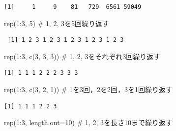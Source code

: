 \documentclass[
  letterpaper,
  DIV=11,
  numbers=noendperiod]{scrreprt}
\newenvironment{Shaded}{\begin{snugshade}}{\end{snugshade}}
\newcommand{\AttributeTok}[1]{\textcolor[rgb]{0.40,0.45,0.13}{#1}}
\newcommand{\CommentTok}[1]{\textcolor[rgb]{0.37,0.37,0.37}{#1}}
\newcommand{\DecValTok}[1]{\textcolor[rgb]{0.68,0.00,0.00}{#1}}
\newcommand{\FunctionTok}[1]{\textcolor[rgb]{0.28,0.35,0.67}{#1}}
\newcommand{\NormalTok}[1]{\textcolor[rgb]{0.00,0.23,0.31}{#1}}
\newcommand{\SpecialCharTok}[1]{\textcolor[rgb]{0.37,0.37,0.37}{#1}}
\begin{document}
\begin{verbatim}
[1]     1     9    81   729  6561 59049
\end{verbatim}

\begin{Shaded}
\begin{Highlighting}[]
\FunctionTok{rep}\NormalTok{(}\DecValTok{1}\SpecialCharTok{:}\DecValTok{3}\NormalTok{, }\DecValTok{5}\NormalTok{) }\CommentTok{\# 1, 2, 3を5回繰り返す}
\end{Highlighting}
\end{Shaded}

\begin{verbatim}
 [1] 1 2 3 1 2 3 1 2 3 1 2 3 1 2 3
\end{verbatim}

\begin{Shaded}
\begin{Highlighting}[]
\FunctionTok{rep}\NormalTok{(}\DecValTok{1}\SpecialCharTok{:}\DecValTok{3}\NormalTok{, }\FunctionTok{c}\NormalTok{(}\DecValTok{3}\NormalTok{, }\DecValTok{3}\NormalTok{, }\DecValTok{3}\NormalTok{)) }\CommentTok{\# 1, 2, 3をそれぞれ3回繰り返す}
\end{Highlighting}
\end{Shaded}

\begin{verbatim}
[1] 1 1 1 2 2 2 3 3 3
\end{verbatim}

\begin{Shaded}
\begin{Highlighting}[]
\FunctionTok{rep}\NormalTok{(}\DecValTok{1}\SpecialCharTok{:}\DecValTok{3}\NormalTok{, }\FunctionTok{c}\NormalTok{(}\DecValTok{3}\NormalTok{, }\DecValTok{2}\NormalTok{, }\DecValTok{1}\NormalTok{)) }\CommentTok{\# 1を3回，2を2回，3を1回繰り返す}
\end{Highlighting}
\end{Shaded}

\begin{verbatim}
[1] 1 1 1 2 2 3
\end{verbatim}

\begin{Shaded}
\begin{Highlighting}[]
\FunctionTok{rep}\NormalTok{(}\DecValTok{1}\SpecialCharTok{:}\DecValTok{3}\NormalTok{, }\AttributeTok{length.out=}\DecValTok{10}\NormalTok{) }\CommentTok{\# 1, 2, 3を長さ10まで繰り返す}
\end{Highlighting}
\end{Shaded}
\end{document}
